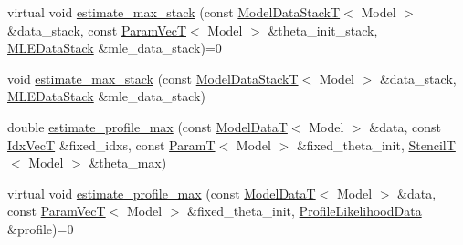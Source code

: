 \begin{DoxyCompactItemize}
\item 
virtual void \hyperlink{classmappel_1_1estimator_1_1Estimator_af7afea557c4090fcd3fe848df984653e}{estimate\+\_\+max\+\_\+stack} (const \hyperlink{namespacemappel_aaeb6665bc57476dd93c2df6ad8bc4768}{Model\+Data\+StackT}$<$ Model $>$ \&data\+\_\+stack, const \hyperlink{namespacemappel_a0f86d3153e4e27b095012f140eea58de}{Param\+VecT}$<$ Model $>$ \&theta\+\_\+init\+\_\+stack, \hyperlink{namespacemappel_1_1estimator_structmappel_1_1estimator_1_1MLEDataStack}{M\+L\+E\+Data\+Stack} \&mle\+\_\+data\+\_\+stack)=0
\item 
void \hyperlink{classmappel_1_1estimator_1_1Estimator_aba9d96880ade861e4086b5c2cbde46b1}{estimate\+\_\+max\+\_\+stack} (const \hyperlink{namespacemappel_aaeb6665bc57476dd93c2df6ad8bc4768}{Model\+Data\+StackT}$<$ Model $>$ \&data\+\_\+stack, \hyperlink{namespacemappel_1_1estimator_structmappel_1_1estimator_1_1MLEDataStack}{M\+L\+E\+Data\+Stack} \&mle\+\_\+data\+\_\+stack)
\end{DoxyCompactItemize}

{\bf }\par
\begin{DoxyCompactItemize}
\item 
double \hyperlink{classmappel_1_1estimator_1_1Estimator_aaadd90fa484e5becd980d2c3e268c97b}{estimate\+\_\+profile\+\_\+max} (const \hyperlink{namespacemappel_a97f050df953605381ae9c901c3b125f1}{Model\+DataT}$<$ Model $>$ \&data, const \hyperlink{namespacemappel_ac63743dcd42180127307cd0e4ecdd784}{Idx\+VecT} \&fixed\+\_\+idxs, const \hyperlink{namespacemappel_a667925cb0d6c0e49f2f035cc5a9a6857}{ParamT}$<$ Model $>$ \&fixed\+\_\+theta\+\_\+init, \hyperlink{namespacemappel_a3a06598240007876f8c4bf834ad86197}{StencilT}$<$ Model $>$ \&theta\+\_\+max)
\item 
virtual void \hyperlink{classmappel_1_1estimator_1_1Estimator_aebcf83a1264fa41f6608a77fa239a60c}{estimate\+\_\+profile\+\_\+max} (const \hyperlink{namespacemappel_a97f050df953605381ae9c901c3b125f1}{Model\+DataT}$<$ Model $>$ \&data, const \hyperlink{namespacemappel_a0f86d3153e4e27b095012f140eea58de}{Param\+VecT}$<$ Model $>$ \&fixed\+\_\+theta\+\_\+init, \hyperlink{namespacemappel_1_1estimator_structmappel_1_1estimator_1_1ProfileLikelihoodData}{Profile\+Likelihood\+Data} \&profile)=0
\end{DoxyCompactItemize}

